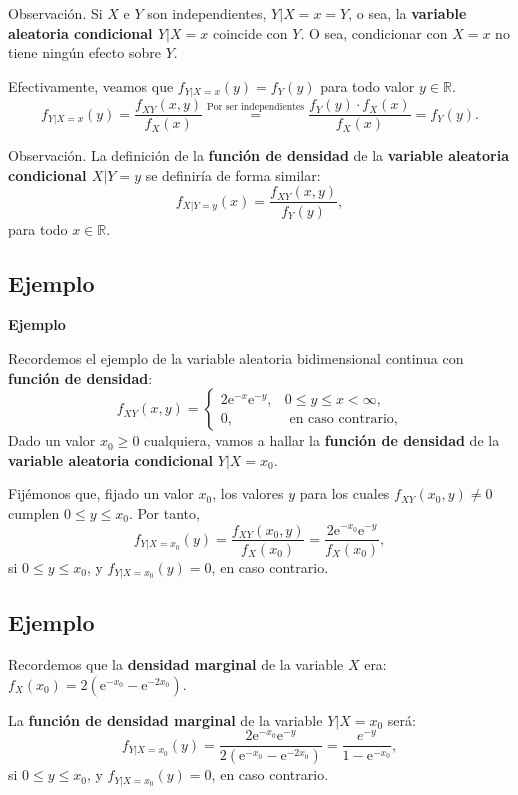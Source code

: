 \documentclass[]{book}
\begin{document}
Observación.
Si \(X\) e \(Y\) son independientes, \(Y|X=x =Y\), o sea, la \textbf{variable aleatoria condicional \(Y|X=x\)} coincide con \(Y\). O sea, condicionar con \(X=x\) no tiene ningún efecto sobre \(Y\).

Efectivamente, veamos que \(f_{Y|X=x}(y)=f_Y(y)\) para todo valor \(y\in\mathbb{R}.\)
\[
f_{Y|X=x}(y) =\frac{f_{XY}(x,y)}{f_X(x)} \stackrel{\mbox{Por ser independientes}}{=}\frac{f_Y(y)\cdot f_X(x)}{f_X(x)}=f_Y(y).
\]

Observación.
La definición de la \textbf{función de densidad} de la \textbf{variable aleatoria condicional \(X|Y=y\)} se definiría de forma similar:
\[
f_{X|Y=y}(x)=\frac{f_{XY}(x,y)}{f_Y(y)},
\]
para todo \(x\in\mathbb{R}\).

\hypertarget{ejemplo-67}{%
\subsection{Ejemplo}\label{ejemplo-67}}

\textbf{Ejemplo}

Recordemos el ejemplo de la variable aleatoria bidimensional continua con \textbf{función de densidad}:
\[
f_{XY}(x,y)=\begin{cases}
2 \mathrm{e}^{-x}\mathrm{e}^{-y}, & 0\leq y\leq x < \infty,\\
0, & \mbox{ en caso contrario,}
\end{cases}
\]
Dado un valor \(x_0\geq 0\) cualquiera, vamos a hallar la \textbf{función de densidad} de la \textbf{variable aleatoria condicional} \(Y|X=x_0\).

Fijémonos que, fijado un valor \(x_0\), los valores \(y\) para los cuales \(f_{XY}(x_0,y)\neq 0\) cumplen \(0\leq y\leq x_0\).
Por tanto,
\[
f_{Y|X=x_0}(y)=\frac{f_{XY}(x_0,y)}{f_X(x_0)}=\frac{2\mathrm{e}^{-x_0}\mathrm{e}^{-y}}{f_X(x_0)},
\]
si \(0\leq y\leq x_0\), y \(f_{Y|X=x_0}(y)=0\), en caso contrario.

\hypertarget{ejemplo-68}{%
\subsection{Ejemplo}\label{ejemplo-68}}

Recordemos que la \textbf{densidad marginal} de la variable \(X\) era: \(f_X(x_0)=2\left(\mathrm{e}^{-x_0}-\mathrm{e}^{-2x_0}\right)\).

La \textbf{función de densidad marginal} de la variable \(Y|X=x_0\) será:
\[
f_{Y|X=x_0}(y)=\frac{2\mathrm{e}^{-x_0}\mathrm{e}^{-y}}{2\left(\mathrm{e}^{-x_0}-\mathrm{e}^{-2x_0}\right)}=\frac{e^{-y}}{1-\mathrm{e}^{-x_0}},
\]
si \(0\leq y\leq x_0\), y \(f_{Y|X=x_0}(y)=0\), en caso contrario.
\end{document}
